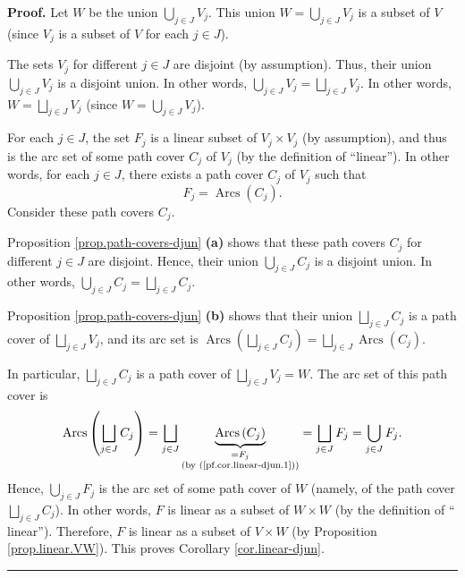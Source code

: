 \documentclass[numbers=enddot,12pt,final,onecolumn,notitlepage]{scrartcl}%
\numberwithin{exer}{section}
\theoremstyle{definition}
\newenvironment{proof}[1][Proof]{\noindent\textbf{#1.} }{\ \rule{0.5em}{0.5em}}
\let\cupnonlimits\bigcup
\let\sqcupnonlimits\bigsqcup
\renewcommand{\bigcup}{\cupnonlimits\limits}
\renewcommand{\bigsqcup}{\sqcupnonlimits\limits}
\newenvironment{verlong}{}{}
\begin{document}
\begin{verlong}


\begin{proof}
Let $W$ be the union $\bigcup_{j\in J}V_{j}$. This union $W=\bigcup_{j\in
J}V_{j}$ is a subset of $V$ (since $V_{j}$ is a subset of $V$ for each $j\in
J$).

The sets $V_{j}$ for different $j\in J$ are disjoint (by assumption). Thus,
their union $\bigcup_{j\in J}V_{j}$ is a disjoint union. In other words,
$\bigcup_{j\in J}V_{j}=\bigsqcup_{j\in J}V_{j}$. In other words,
$W=\bigsqcup_{j\in J}V_{j}$ (since $W=\bigcup_{j\in J}V_{j}$).

For each $j\in J$, the set $F_{j}$ is a linear subset of $V_{j}\times V_{j}$
(by assumption), and thus is the arc set of some path cover $C_{j}$ of $V_{j}$
(by the definition of \textquotedblleft linear\textquotedblright). In other
words, for each $j\in J$, there exists a path cover $C_{j}$ of $V_{j}$ such
that
\begin{equation}
F_{j}=\operatorname*{Arcs}\left(  C_{j}\right)  . \label{pf.cor.linear-djun.1}%
\end{equation}
Consider these path covers $C_{j}$.

Proposition \ref{prop.path-covers-djun} \textbf{(a)} shows that these path
covers $C_{j}$ for different $j\in J$ are disjoint. Hence, their union
$\bigcup_{j\in J}C_{j}$ is a disjoint union. In other words, $\bigcup_{j\in
J}C_{j}=\bigsqcup_{j\in J}C_{j}$.

Proposition \ref{prop.path-covers-djun} \textbf{(b)} shows that their union
$\bigsqcup_{j\in J}C_{j}$ is a path cover of $\bigsqcup_{j\in J}V_{j}$, and
its arc set is $\operatorname*{Arcs}\left(  \bigsqcup_{j\in J}C_{j}\right)
=\bigsqcup_{j\in J}\operatorname*{Arcs}\left(  C_{j}\right)  $.

In particular, $\bigsqcup_{j\in J}C_{j}$ is a path cover of $\bigsqcup_{j\in
J}V_{j}=W$. The arc set of this path cover is%
\[
\operatorname*{Arcs}\left(  \bigsqcup_{j\in J}C_{j}\right)  =\bigsqcup_{j\in
J}\underbrace{\operatorname*{Arcs}\left(  C_{j}\right)  }_{\substack{=F_{j}%
\\\text{(by (\ref{pf.cor.linear-djun.1}))}}}=\bigsqcup_{j\in J}F_{j}%
=\bigcup_{j\in J}F_{j}.
\]
Hence, $\bigcup_{j\in J}F_{j}$ is the arc set of some path cover of $W$
(namely, of the path cover $\bigsqcup_{j\in J}C_{j}$). In other words, $F$ is
linear as a subset of $W\times W$ (by the definition of \textquotedblleft
linear\textquotedblright). Therefore, $F$ is linear as a subset of $V\times W$
(by Proposition \ref{prop.linear.VW}). This proves Corollary
\ref{cor.linear-djun}.
\end{proof}
\end{verlong}
\end{document}
